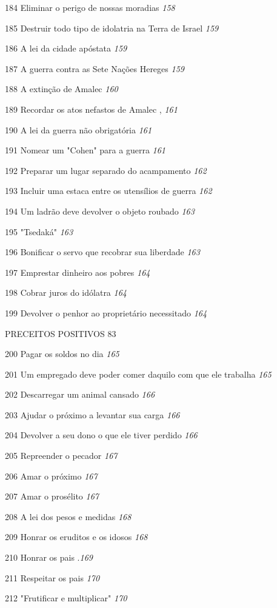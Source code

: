 184 Eliminar o perigo de nossas moradias \emph{158}

185 Destruir todo tipo de idolatria na Terra de Israel \emph{159}

186 A lei da cidade apóstata \emph{159}

187 A guerra contra as Sete Nações Hereges \emph{159}

188 A extinção de Amalec \emph{160}

189 Recordar os atos nefastos de Amalec , \emph{161}

190 A lei da guerra não obrigatória \emph{161}

191 Nomear um "Cohen" para a guerra \emph{161}

192 Preparar um lugar separado do acampamento \emph{162}

193 Incluir uma estaca entre os utensílios de guerra \emph{162}

194 Um ladrão deve devolver o objeto roubado \emph{163}

195 "Tsedaká" \emph{163}

196 Bonificar o servo que recobrar sua liberdade \emph{163}

197 Emprestar dinheiro aos pobres \emph{164}

198 Cobrar juros do idólatra \emph{164}

199 Devolver o penhor ao proprietário necessitado \emph{164}

PRECEITOS POSITIVOS 83

200 Pagar os soldos no dia \emph{165}

201 Um empregado deve poder comer daquilo com que ele trabalha
\emph{165}

202 Descarregar um animal cansado \emph{166}

203 Ajudar o próximo a levantar sua carga \emph{166}

204 Devolver a seu dono o que ele tiver perdido \emph{166}

205 Repreender o pecador \emph{167}

206 Amar o próximo \emph{167}

207 Amar o prosélito \emph{167}

208 A lei dos pesos e medidas \emph{168}

209 Honrar os eruditos e os idosos \emph{168}

210 Honrar os pais .\emph{169}

211 Respeitar os pais \emph{170}

212 "Frutificar e multiplicar" \emph{170}

